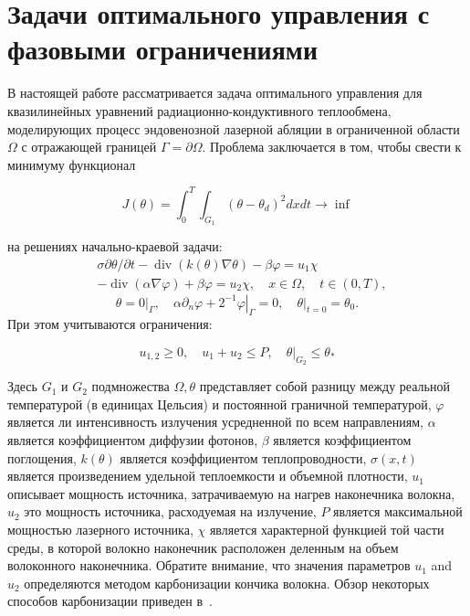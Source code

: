 \section{Задачи оптимального управления с фазовыми ограничениями}
\label{sec:ch3:sec2}
%
В настоящей работе рассматривается задача оптимального
управления для квазилинейных уравнений радиационно-кондуктивного
теплообмена, моделирующих процесс эндовенозной
лазерной абляции в ограниченной области $\Omega$ с отражающей границей $\Gamma=\partial\Omega$.
Проблема заключается в том, чтобы свести к минимуму функционал

\[ J(\theta)=\int_{0}^{T} \int_{G_{1}}\left(\theta-\theta_{d}\right)^{2} dx dt \rightarrow \inf \]

на решениях начально-краевой задачи:
\begin{equation}
    \label{eq:3_2:1}
    \begin{aligned}
        &\sigma \partial \theta / \partial t-\operatorname{div}(k(\theta)
        \nabla \theta)-\beta \varphi=u_{1} \chi \\
        &-\operatorname{div}(\alpha \nabla \varphi)+\beta \varphi=u_{2}
        \chi, \quad x \in \Omega, \quad t \in(0, T),
    \end{aligned}
\end{equation}
\begin{equation}
    \label{eq:3_2:2}
    \theta=\left.0\right|_{\Gamma},
    \quad \alpha \partial_{n} \varphi
    +\left.2^{-1} \varphi\right|_{\Gamma}=0,
    \left.\quad \theta\right|_{t=0}=\theta_{0}.
\end{equation}
При этом учитываются ограничения:

\[ u_{1,2} \geq 0, \quad u_{1}+u_{2} \leq P,
\left.\quad \theta\right|_{G_{2}} \leq \theta_{*} \]

Здесь $G_{1}$ и $G_{2}$ подмножества $\Omega, \theta$
представляет собой разницу между реальной температурой
(в единицах Цельсия) и постоянной граничной температурой,
$\varphi$ является ли интенсивность излучения усредненной по всем направлениям, $\alpha$
является коэффициентом диффузии фотонов, $\beta$ является коэффициентом поглощения,
$k(\theta)$ является коэффициентом теплопроводности, $\sigma(x, t)$
является произведением удельной теплоемкости и объемной плотности, $u_{1}$
описывает мощность источника, затрачиваемую на нагрев наконечника волокна, $u_{2}$
это мощность источника, расходуемая на излучение,
$P$ является максимальной мощностью лазерного источника, $\chi$
является характерной функцией той части среды, в которой волокно
наконечник расположен деленным на объем волоконного наконечника.
Обратите внимание, что значения параметров $u_{1}$ and $u_{2}$
определяются методом карбонизации кончика волокна.
Обзор некоторых способов карбонизации приведен в~\cite{Optimal_Kovtanyuk2020}.

